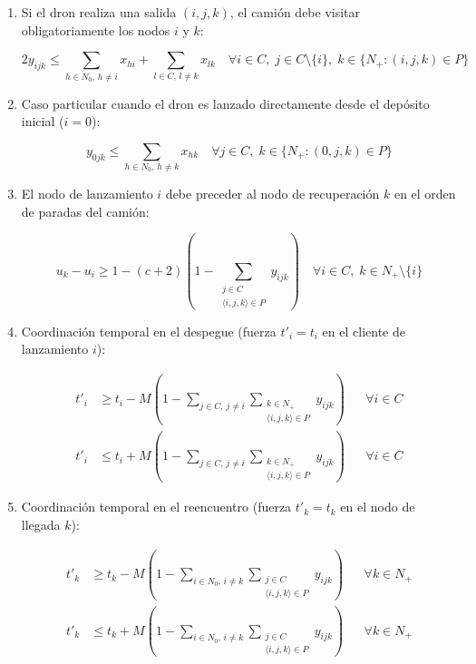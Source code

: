 \begin{enumerate}
\item Si el dron realiza una salida $( i, j, k )$, el camión debe visitar obligatoriamente los nodos $i$ y $k$:

\begin{equation}
  2 y_{ijk} \le \sum_{h \in N_0,\, h \neq i} x_{hi} + \sum_{l \in C,\, l \neq k} x_{lk} \quad \forall i \in C, \; j \in C \setminus \{i\}, \; k \in \{N_+ : (i,j,k) \in P\} 
\tag{9}
\end{equation}

\item Caso particular cuando el dron es lanzado directamente desde el depósito inicial ($i=0$):

\begin{equation}
  y_{0jk} \le \sum_{h \in N_0,\, h \neq k} x_{hk} \quad \forall j \in C, \; k \in \{N_+ : ( 0,j,k ) \in P\} 
\tag{10}
\end{equation}

\item El nodo de lanzamiento $i$ debe preceder al nodo de recuperación $k$ en el orden de paradas del camión:

\begin{equation}
u_k - u_i \ge 1 - (c+2)\left(1 - \sum_{\substack{j \in C \\ \langle i,j,k \rangle \in P}} y_{ijk}\right) \quad \forall i \in C, \; k \in N_+ \setminus \{i\} 
\tag{11}
\end{equation}

\item Coordinación temporal en el despegue (fuerza $t'_i = t_i$ en el cliente de lanzamiento $i$):

\begin{align*}
t'_i &\ge t_i - M\left(1 - \sum_{j \in C,\, j \neq i} \sum_{\substack{k \in N_+ \\ \langle i,j,k \rangle \in P}} y_{ijk}\right) && \forall i \in C \tag{12} \\
t'_i &\le t_i + M\left(1 - \sum_{j \in C,\, j \neq i} \sum_{\substack{k \in N_+ \\ \langle i,j,k \rangle \in P}} y_{ijk}\right) && \forall i \in C \tag{13}
\end{align*}

\item Coordinación temporal en el reencuentro (fuerza $t'_k = t_k$ en el nodo de llegada $k$):

\begin{align*}
t'_k &\ge t_k - M\left(1 - \sum_{i \in N_0,\, i \neq k} \sum_{\substack{j \in C \\ \langle i,j,k \rangle \in P}} y_{ijk}\right) && \forall k \in N_+ \tag{14} \\
t'_k &\le t_k + M\left(1 - \sum_{i \in N_0,\, i \neq k} \sum_{\substack{j \in C \\ \langle i,j,k \rangle \in P}} y_{ijk}\right) && \forall k \in N_+ \tag{15}
\end{align*}


\end{enumerate}
